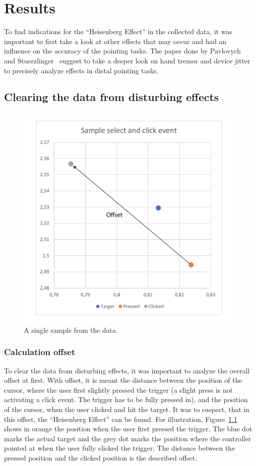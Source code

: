 
\chapter{Results}
\label{ch:results}

To find indications for the ``Heisenberg Effect'' in the collected data, it was important to first take a look at other effects that may occur and had an influence on the accuracy of the pointing tasks. The paper done by Pavlovych and Stuerzlinger~\cite{pavlovych_tradeoff_2009} suggest to take a deeper look on hand tremor and device jitter to precisely analyze effects in distal pointing tasks. 

\section{Clearing the data from disturbing effects}
\label{sec:evaluation:clearing_the_data}

\begin{figure}[h]
    \centering
    \includegraphics[width=.45\columnwidth]{graphics/graphs/sample_point_and_click_event_edited.pdf}
    \caption{A single sample from the data. }
    \label{fig:sample_point_and_click_event}
\end{figure}

\subsection{Calculation offset}
\label{subsec:evaluation:clearing_the_data:calculating_offset}

To clear the data from disturbing effects, it was important to analyze the overall offset at first. With offset, it is meant the distance between the position of the cursor, where the user first slightly pressed the trigger (a slight press is not activating a click event. The trigger has to be fully pressed in), and the position of the cursor, when the user clicked and hit the target. It was to suspect, that in this offset, the ``Heisenberg Effect'' can be found. For illustration, Figure~\ref{fig:sample_point_and_click_event} shows in orange the position when the user first pressed the trigger. The blue dot marks the actual target and the grey dot marks the position where the controller pointed at when the user fully clicked the trigger. The distance between the pressed position and the clicked position is the described offset.

